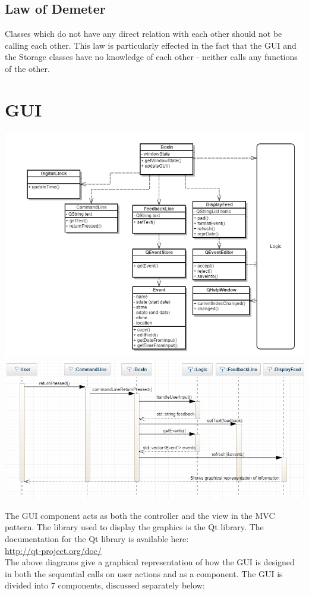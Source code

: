 \documentclass[12pt]{extarticle}
\begin{document}
\subsection{Law of Demeter}
Classes which do not have any direct relation with each other should not be calling each other. This law is particularly effected in the fact that the GUI and the Storage classes have no knowledge of each other - neither calls any functions of the other.


\section{GUI}
\includegraphics[width=\textwidth / 2]{GUI_class_diagram}
\includegraphics[width=\textwidth / 2]{gui_sequence_diagram}



The GUI component acts as both the controller and the view in the MVC pattern. The library used to display the graphics is the Qt library. The documentation for the Qt library is available here:\\ \href{http://qt-project.org/doc/}{http://qt-project.org/doc/}\\
The above diagrams give a graphical representation of how the GUI is designed in both the sequential calls on user actions and as a component.
The GUI is divided into 7 components, discussed separately below:
\end{document}
